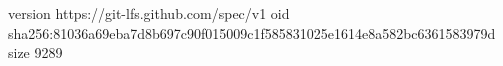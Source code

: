 version https://git-lfs.github.com/spec/v1
oid sha256:81036a69eba7d8b697c90f015009c1f585831025e1614e8a582bc6361583979d
size 9289
